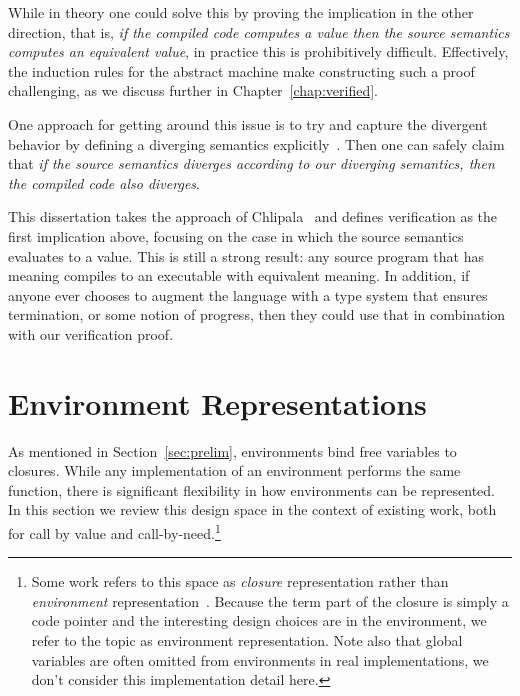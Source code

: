 While in theory one could solve this by proving the implication in the other
direction, that is, \emph{if the compiled code computes a value then the source
semantics computes an equivalent value}, in practice this is prohibitively
difficult. Effectively, the induction rules for the abstract machine make
constructing such a proof challenging, as we discuss further in
Chapter~\ref{chap:verified}.

One approach for getting around this issue is to try and capture the divergent
behavior by defining a diverging semantics explicitly~\cite{functionalbigstep}.
Then one can safely claim that \emph{if the source semantics diverges according to
our diverging semantics, then the compiled code also diverges}. 

This dissertation takes the approach of Chlipala~\cite{chlipala2007certified}
and defines verification as the first implication above, focusing on the case in
which the source semantics evaluates to a value. This is still a strong
result: any source program that has meaning compiles to an executable with
equivalent meaning. In addition, if anyone ever chooses to augment the language
with a type system that ensures termination, or some notion of progress, then
they could use that in combination with our verification proof.

\section{Environment Representations} \label{sec:env}

As mentioned in Section~\ref{sec:prelim}, environments bind free variables to
closures. While any implementation of an environment performs the same function,
there is significant flexibility in how environments can be represented. In this
section we review this design space in the context of existing work, both for
call by value and call-by-need.\footnote{Some work refers to this space as
\emph{closure} representation rather than \emph{environment}
representation~\cite{shao1994space,appel1988optimizing}.  Because the term part
of the closure is simply a code pointer and the interesting design choices are
in the environment, we refer to the topic as environment representation. Note
also that global variables are often omitted from environments in real
implementations, we don't consider this implementation detail here.}

